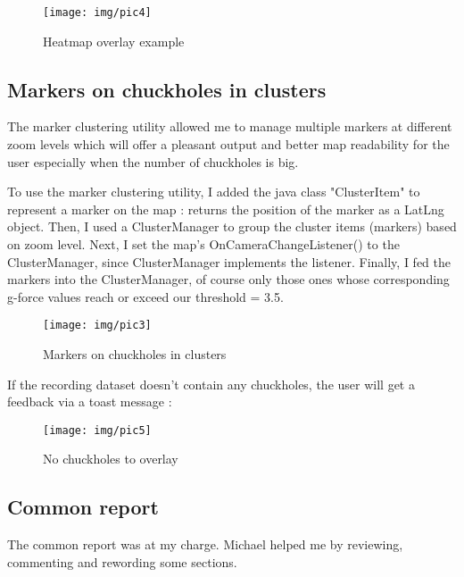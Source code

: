 \documentclass[10pt,a4paper]{article} %
\begin{document}
	\begin{figure}[H]
    \centering
	   
       	\texttt{[image: img/pic4]}
       	\caption{Heatmap overlay example}
	\label{fig:heatmap_overlay}
       
    \end{figure}

\subsection{Markers on chuckholes in clusters}\label{subsec:markers}

The marker clustering utility allowed me to manage multiple markers at different zoom levels which will offer a pleasant output and better map readability for the user especially when the number of chuckholes is big.

\noindent
To use the marker clustering utility, I added the java class "ClusterItem" to  represent a marker on the map : returns the position of the marker as a LatLng object. Then, I used a ClusterManager to group the cluster items (markers) based on zoom level. Next, I set the map's OnCameraChangeListener() to the ClusterManager, since ClusterManager implements the listener. Finally, I fed the markers into the ClusterManager, of course only those ones whose corresponding g-force values reach or exceed our threshold = 3.5.

    
    \begin{figure}[H]
    \centering
	
	   
       	\texttt{[image: img/pic3]}
   	\caption{Markers on chuckholes in clusters}
	\label{fig:markers_overlay1}
	\end{figure}
    
If the recording dataset doesn't contain any chuckholes, the user will get a feedback via a toast message : 

\begin{figure}[H]
    \centering
	
	   
       	\texttt{[image: img/pic5]}
   	\caption{No chuckholes to overlay}
	\label{fig:markers_overlay2}
	\end{figure}


\subsection{Common report}\label{subsec:report}

The common report was at my charge. Michael helped me by reviewing, commenting and rewording some sections.
    
\end{document}
